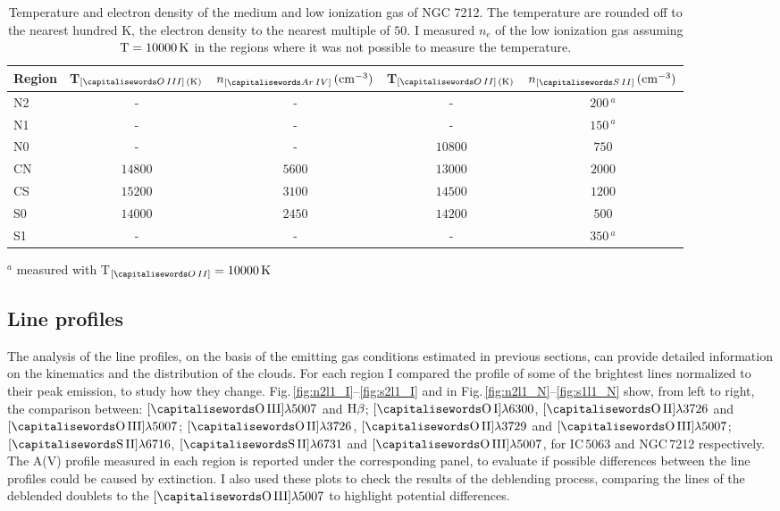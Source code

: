 \documentclass[../main.tex]{subfiles}
\begin{document}
\begin{table}
\caption[]{Temperature and electron density of the medium and low ionization gas of NGC 7212.
The temperature are rounded off to the nearest hundred K, the electron density to the nearest multiple of $50$. 
I measured $n_e$ of the low ionization gas assuming $\rm{T}=10000\,\si{K}$ in the regions where it was not possible to measure the temperature.}
\label{tab:ted_n}
\centering
\begin{threeparttable}
\begin{tabular}{lcccc}
\hline
Region&T$_{[\ion{O}{III}]\,(\si{K})}$&$n_{[\ion{Ar}{IV}]}\,(\si{cm^{-3}})$&T$_{[\ion{O}{II}]\,(\si{K})}$&$n_{[\ion{S}{II}]}\,(\si{cm^{-3}})$\\
\hline
N2&-&-&-&$200\,^a$\\
N1&-&-&-&$150\,^a$\\
N0&-&-&$10800$&$750$\\
CN&$14800$&$5600$&$13000$&$2000$\\
CS&$15200$&$3100$&$14500$&$1200$\\
S0&$14000$&$2450$&$14200$&$500$\\
S1&-&-&-&$350\,^a$\\
\hline
\end{tabular}
\begin{tablenotes}
\item $^a$ measured with T$_{[\ion{O}{II}]}= 10000\,\si{K}$
\end{tablenotes}
\end{threeparttable}
\end{table}

\subsection{Line profiles}
\label{sec:lineprof}

The analysis of the line profiles, on the basis of the emitting gas conditions estimated in previous sections, can provide detailed information on the kinematics and the distribution of the clouds.
For each region I compared the profile of some of the brightest lines normalized to their peak emission, to study how they change.
Fig.\,\ref{fig:n2l1_I}--\ref{fig:s2l1_I} and in Fig.\,\ref{fig:n2l1_N}--\ref{fig:s1l1_N} show, from left to right, the comparison between: $[\rm\ion{O}{III}]\lambda5007$ and $\rm H\beta$; $[\rm\ion{O}{I}]\lambda6300$, $[\rm\ion{O}{II}]\lambda3726$ and $[\rm\ion{O}{III}]\lambda5007$; $[\rm\ion{O}{II}]\lambda3726$, $[\rm\ion{O}{II}]\lambda3729$ and $[\rm\ion{O}{III}]\lambda5007$; $[\rm\ion{S}{II}]\lambda6716$, $[\rm\ion{S}{II}]\lambda6731$ and $[\rm\ion{O}{III}]\lambda5007$, for IC\,5063 and NGC\,7212 respectively.
The A(V) profile measured in each region is reported under the corresponding panel, to evaluate if possible differences between the line profiles could be caused by extinction.
I also used these plots to check the results of the deblending process, comparing the lines of the deblended doublets to the $[\rm\ion{O}{III}]\lambda5007$ to highlight potential differences.
\end{document}
